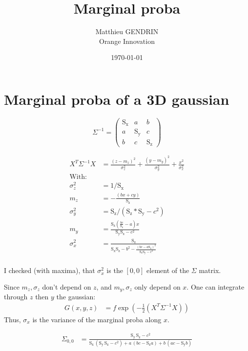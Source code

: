 \documentclass{article}
\title{Marginal proba}
\author{Matthieu GENDRIN \\
	Orange Innovation
	}
\date{\today}
\begin{document}
\maketitle

\section{Marginal proba of a 3D gaussian}

\[\Sigma^{-1} = \begin{pmatrix}\ensuremath{\mathrm{S_x}} & a & b\\
a & \ensuremath{\mathrm{S_y}} & c\\
b & c & \ensuremath{\mathrm{S_z}}\end{pmatrix}\]

\begin{align}
    X^T \Sigma^{-1} X & = \frac{(z-m_z)^2}{\sigma_z^2} + \frac{(y-m_y)^2}{\sigma_y^2} + \frac{x^2}{\sigma_x^2} \nonumber \\
    \text{With:} & \nonumber \\
    \sigma_z^2 & = 1 / \ensuremath{\mathrm{S_x}} \nonumber \\
    m_z & = - \frac{(b x + c y)}{\ensuremath{\mathrm{S_z}}} \nonumber \\
    \sigma_y^2 & = \ensuremath{\mathrm{S_z}} / (\ensuremath{\mathrm{S_z}} * \ensuremath{\mathrm{S_y}} - c^2) \nonumber \\
    m_y & = \frac{\ensuremath{\mathrm{S_z}} (\frac{b c}{\ensuremath{\mathrm{S_z}}}-a) x}{\ensuremath{\mathrm{S_y}} \ensuremath{\mathrm{S_z}}-c^2} \nonumber \\
    \sigma_{x}^2 & = \frac{\ensuremath{\mathrm{S_z}}}{\ensuremath{\mathrm{S_x}} \ensuremath{\mathrm{S_z}} - b^2 - \frac{(b c - a \ensuremath{\mathrm{S_z}})^2}{\ensuremath{\mathrm{S_z}} \ensuremath{\mathrm{S_y}} - c^2}} \nonumber \\
\end{align}

I checked (with maxima), that $\sigma_x^2$ is the $[0,0]$ element of the $\Sigma$ matrix.

Since $m_z, \sigma_z$ don't depend on $z$, and $m_y, \sigma_z$ only depend on $x$. One can integrate through $z$ then $y$ the gaussian:
\begin{align}
    G(x,y,z) & = f \exp(-\frac{1}{2} (X^T \Sigma^{-1} X))
\end{align}
Thus, $\sigma_x$ is the variance of the marginal proba along $x$.

\begin{align}
    \Sigma_{0,0} & = \frac{\ensuremath{\mathrm{S_y}}\, \ensuremath{\mathrm{S_z}}-{{c}^{2}}}{\ensuremath{\mathrm{S_x}}\, ( \ensuremath{\mathrm{S_y}}\, \ensuremath{\mathrm{S_z}}-{{c}^{2}}) +a\, ( b c-\ensuremath{\mathrm{S_z}} a) +b\, ( a c-\ensuremath{\mathrm{S_y}} b) } \nonumber
\end{align}
\end{document}

